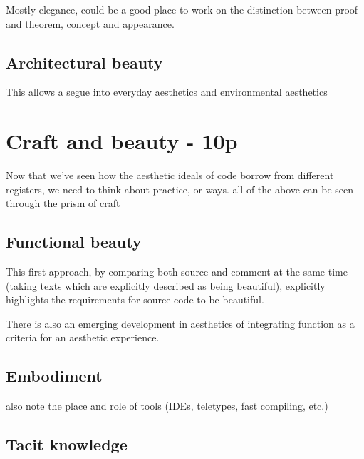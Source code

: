Mostly elegance, could be a good place to work on the distinction between proof and theorem, concept and appearance.

\subsection{Architectural beauty}

This allows a segue into everyday aesthetics and environmental aesthetics

\section{Craft and beauty - 10p}

Now that we've seen how the aesthetic ideals of code borrow from different registers, we need to think about practice, or ways. all of the above can be seen through the prism of craft

\subsection{Functional beauty}

This first approach, by comparing both source and comment at the same time (taking texts which are explicitly described as being beautiful), explicitly highlights the requirements for source code to be beautiful. 

There is also an emerging development in aesthetics of integrating function as a criteria for an aesthetic experience.

\subsection{Embodiment}

also note the place and role of tools (IDEs, teletypes, fast compiling, etc.)

\subsection{Tacit knowledge}

